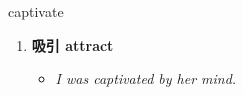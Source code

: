
\begin{frame}
{\huge captivate}
\begin{center}
\begin{enumerate}\Large
  \item \textbf{吸引 attract}
  \begin{itemize}
    \item \em{\Large{I was captivated by her mind.}}
  \end{itemize}
\end{enumerate}
\end{center}
\end{frame}
